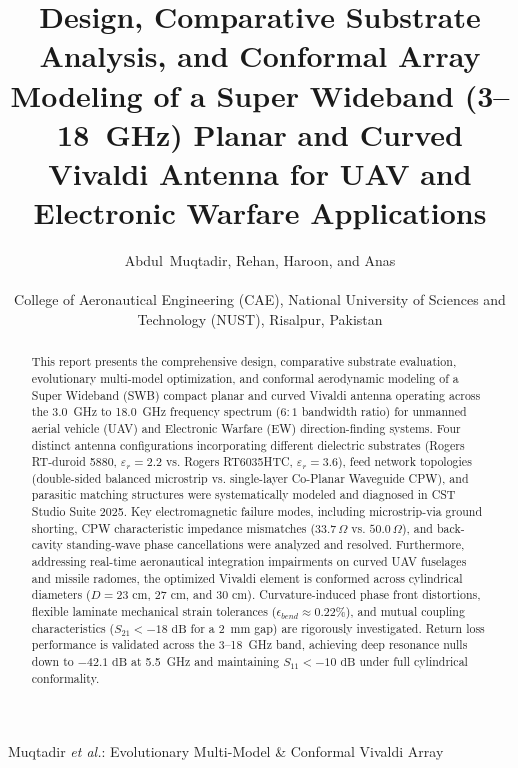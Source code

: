 \documentclass[journal,compsoc,twocolumn,10pt]{IEEEtran}
\begin{document}
\title{Design, Comparative Substrate Analysis, and Conformal Array Modeling of a Super Wideband (3--18~GHz) Planar and Curved Vivaldi Antenna for UAV and Electronic Warfare Applications}

\author{Abdul~Muqtadir, Rehan, Haroon, and Anas \\
 \\
College of Aeronautical Engineering (CAE), National University of Sciences and Technology (NUST), Risalpur, Pakistan \\
}

%
{Muqtadir \MakeLowercase{\textit{et al.}}: Evolutionary Multi-Model & Conformal Vivaldi Array}

\maketitle

\begin{abstract}
This report presents the comprehensive design, comparative substrate evaluation, evolutionary multi-model optimization, and conformal aerodynamic modeling of a Super Wideband (SWB) compact planar and curved Vivaldi antenna operating across the 3.0~GHz to 18.0~GHz frequency spectrum ($6:1$ bandwidth ratio) for unmanned aerial vehicle (UAV) and Electronic Warfare (EW) direction-finding systems. Four distinct antenna configurations incorporating different dielectric substrates (Rogers RT-duroid 5880, $\varepsilon_r = 2.2$ vs. Rogers RT6035HTC, $\varepsilon_r = 3.6$), feed network topologies (double-sided balanced microstrip vs. single-layer Co-Planar Waveguide CPW), and parasitic matching structures were systematically modeled and diagnosed in CST Studio Suite 2025. Key electromagnetic failure modes, including microstrip-via ground shorting, CPW characteristic impedance mismatches ($33.7\,\Omega$ vs. $50.0\,\Omega$), and back-cavity standing-wave phase cancellations were analyzed and resolved. Furthermore, addressing real-time aeronautical integration impairments on curved UAV fuselages and missile radomes, the optimized Vivaldi element is conformed across cylindrical diameters ($D = 23\text{ cm}$, $27\text{ cm}$, and $30\text{ cm}$). Curvature-induced phase front distortions, flexible laminate mechanical strain tolerances ($\epsilon_{bend} \approx 0.22\%$), and mutual coupling characteristics ($S_{21} < -18\text{ dB}$ for a 2~mm gap) are rigorously investigated. Return loss performance is validated across the 3--18~GHz band, achieving deep resonance nulls down to $-42.1\text{ dB}$ at 5.5~GHz and maintaining $S_{11} < -10\text{ dB}$ under full cylindrical conformality.
\end{abstract}
\end{document}

